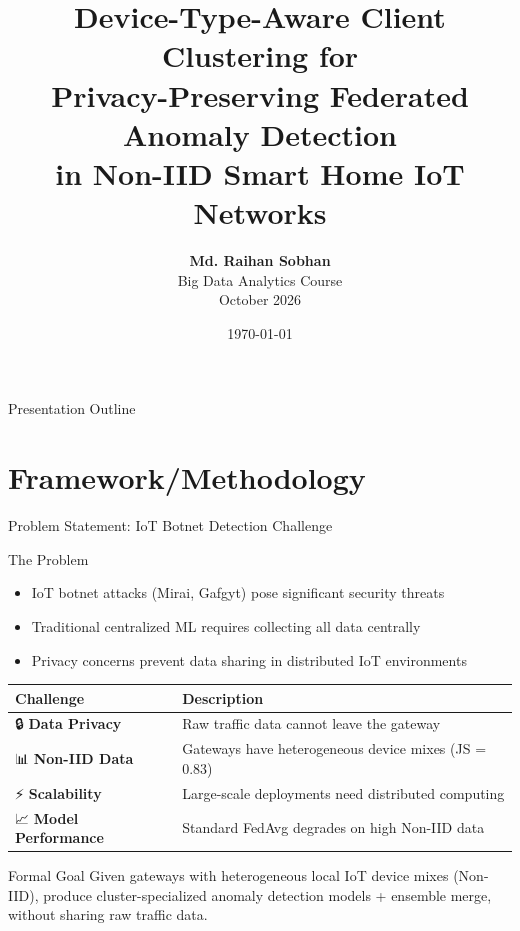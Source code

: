 \documentclass[10pt, aspectratio=169]{beamer}
\title[FedHome: Device-Type-Aware Client Clustering]{
    \textbf{Device-Type-Aware Client Clustering for \\ Privacy-Preserving Federated Anomaly Detection \\ in Non-IID Smart Home IoT Networks}
}
\author[Md. Raihan Sobhan]{
    \textbf{Md. Raihan Sobhan} \\
    Big Data Analytics Course \\
    October 2026
}
\institute{
    Department of Computer Science \\
    Big Data Analytics Project Presentation
}
\date{\today}
\begin{document}
\begin{frame}
    \titlepage
\end{frame}

\begin{frame}{Presentation Outline}
    \tableofcontents
\end{frame}


\section{Framework/Methodology}

\begin{frame}{Problem Statement: IoT Botnet Detection Challenge}
    \begin{block}{The Problem}
        \begin{itemize}
            \item IoT botnet attacks (Mirai, Gafgyt) pose significant security threats
            \item Traditional centralized ML requires collecting all data centrally
            \item Privacy concerns prevent data sharing in distributed IoT environments
        \end{itemize}
    \end{block}
    
    \vspace{0.5cm}
    
    \begin{table}
        \centering
        \footnotesize
        \begin{tabular}{@{}ll@{}}
            \toprule
            \textbf{Challenge} & \textbf{Description} \\
            \midrule
            🔒 \textbf{Data Privacy} & Raw traffic data cannot leave the gateway \\
            📊 \textbf{Non-IID Data} & Gateways have heterogeneous device mixes (JS = 0.83) \\
            ⚡ \textbf{Scalability} & Large-scale deployments need distributed computing \\
            📈 \textbf{Model Performance} & Standard FedAvg degrades on high Non-IID data \\
            \bottomrule
        \end{tabular}
    \end{table}
    
    \vspace{0.3cm}
    \begin{alertblock}{Formal Goal}
        Given gateways with heterogeneous local IoT device mixes (Non-IID), produce cluster-specialized anomaly detection models + ensemble merge, without sharing raw traffic data.
    \end{alertblock}
\end{frame}
\end{document}
